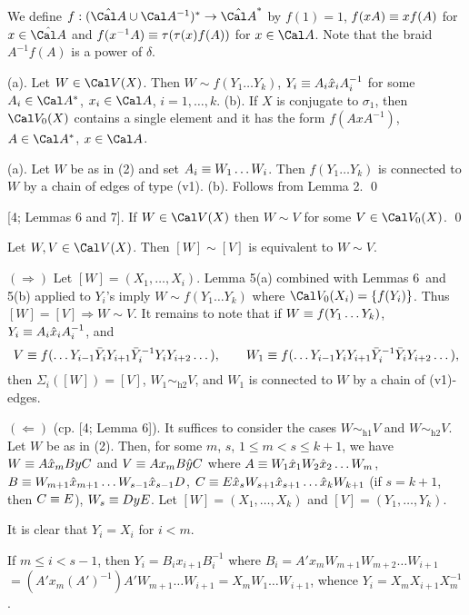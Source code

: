 We define $f:(\hA\cup\Cal A^{-1})^*\to\hA^*$ by
$f(1)=1$, $f(xA)\equiv xf(A)$ for $x\in\hA$ and
$f(x^{-1}A)\equiv\tau(\tau(x)f(A))$ for $x\in\Cal A$.
Note that the braid $A^{-1}f(A)$ is a power of $\delta$.


(a). Let $W\in\Cal V(X)$. Then $W\sim f(Y_1\dots Y_k)$,
$Y_i\equiv A_i\hat x_i A_i^{-1}$ for some
$A_i\in\Cal A^*$, $x_i\in\Cal A$,
$i=1,\dots,k$.
%
(b). If $X$ is conjugate to $\sigma_1$, then $\Cal V_0(X)$ contains a single element
and it has the form $f(AxA^{-1})$, $A\in\Cal A^*$, $x\in\Cal A$. 
\endproclaim

 (a).
Let $W$ be as in (2) and set $A_i\equiv W_1\dots W_i$.
Then $f(Y_1\dots Y_k)$ is connected to $W$ by a chain of edges of type (v1).
(b). Follows from Lemma 2.
\qed\enddemo


 {\rm[4; Lemmas 6 and 7].}
If $W\in\Cal V(X)$ then $W\sim V$
for some $V\in\Cal V_0(X)$.
\qed
\endproclaim

 Let $W,V\in\Cal V(X)$. Then $[W]\sim[V]$
is equivalent to $W\sim V$.
\endproclaim

 $(\Rightarrow)$
Let $[W]=(X_1,\dots,X_i)$.
Lemma 5(a) combined with Lemmas 6\ and 5(b) applied to
$Y_i$'s imply
$W\sim f(Y_1\dots Y_k)$ where $\Cal V_0(X_i)=\{f(Y_i)\}$.
Thus $[W]=[V]\Rightarrow W\sim V$.
It remains to note that if $W\equiv f(Y_1\dots Y_k)$,
$Y_i\equiv A_i\hat x_i A_i^{-1}$, and
$$
V\equiv
f(\dots Y_{i-1}\bar Y_i Y_{i+1}\bar Y_i^{-1}
 Y_i Y_{i+2}\dots ),\qquad
W_1\equiv
f(\dots Y_{i-1} Y_i Y_{i+1}\bar Y_i^{-1}
 \bar Y_i Y_{i+2}\dots),
$$
then $\Sigma_i([W])=[V]$, $W_1\sim_{\text{h2}} V$, and $W_1$ is connected to $W$
by a chain of (v1)-edges.%

\smallskip
$(\Leftarrow)$ (cp. [4; Lemma 6]).
It suffices to consider the cases
$W\sim_{\text{h1}}V$ and $W\sim_{\text{h2}}V$.
Let $W$ be as in (2). Then, for some $m$, $s$, $1\le m<s\le k+1$,
we have $W\equiv A\hat x_m ByC$ and
$V\equiv A x_m B\hat y C$ where $A\equiv W_1\hat x_1W_2\hat x_2\dots W_m$,
$B\equiv W_{m+1}\hat x_{m+1}\dots W_{s-1}\hat x_{s-1} D$,
$C\equiv E\hat x_s W_{s+1}\hat x_{s+1}\dots \hat x_k W_{k+1}$
(if $s=k+1$, then $C\equiv E$),
$W_s\equiv DyE$.
Let $[W]=(X_1,\dots,X_k)$ and $[V]=(Y_1,\dots,Y_k)$.

It is clear that $Y_i=X_i$ for $i<m$.

If $m\le i < s-1$, then
$Y_i = B_i x_{i+1} B_i^{-1}$ where
$B_i=A'x_m W_{m+1}W_{m+2}\dots W_{i+1}$
$=(A'x_m(A')^{-1})A' W_{m+1}\dots W_{i+1}=X_m W_1\dots W_{i+1}$, whence
$Y_i = X_m X_{i+1} X_m^{-1}$.

